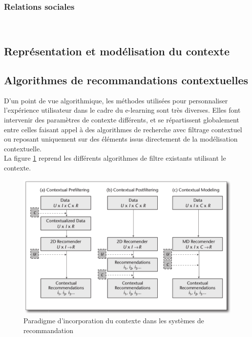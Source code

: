 \documentclass[conference]{./sty/IEEEtran}
\begin{document}
\subsubsection{Relations sociales}
~\\

\subsection{Représentation et modélisation du contexte}

\subsection{Algorithmes de recommandations contextuelles}

D'un point de vue algorithmique, les méthodes utilisées pour personnaliser
l'expérience utilisateur dans le cadre du e-learning sont très diverses. Elles
font intervenir des paramètres de contexte différents, et se répartissent
globalement entre celles faisant appel à des algorithmes de recherche avec
filtrage contextuel ou reposant uniquement sur des éléments issus directement
de la modélisation contextuelle. \\

La figure \ref{fig:algos} reprend les différents algorithmes de filtre
existants utilisant le contexte. \\

\begin{figure}[tb]
  \centering
  \caption{\label{fig:algos} Paradigme d'incorporation du contexte dans les systèmes de recommandation \cite{DBLP:journals/aim/AdomaviciusMRT11}}
  \includegraphics[width=\textwidth]{algo}
\end{figure}
\end{document}
